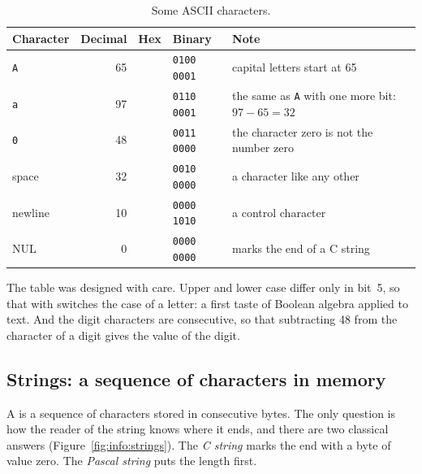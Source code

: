 \begin{table}[htb]
\centering\small
\caption{Some ASCII characters.}\label{tab:info:ascii}
\begin{tabularx}{\textwidth}{@{}lrllL@{}}
\toprule
\textbf{Character} & \textbf{Decimal} & \textbf{Hex} & \textbf{Binary} & \textbf{Note}\\
\midrule
\texttt{A} & 65 &  & \texttt{0100 0001} & capital letters start at 65\\
\texttt{a} & 97 &  & \texttt{0110 0001} & the same as \texttt{A} with one more bit: $97-65=32$\\
\texttt{0} & 48 &  & \texttt{0011 0000} & the character zero is not the number zero\\
space & 32 &  & \texttt{0010 0000} & a character like any other\\
newline & 10 &  & \texttt{0000 1010} & a control character\\
NUL & 0 &  & \texttt{0000 0000} & marks the end of a C string\\
\bottomrule
\end{tabularx}
\end{table}

The table was designed with care. Upper and lower case differ only in bit~5,
so that  with  switches the case of a letter: a first taste
of Boolean algebra applied to text. And the digit characters are consecutive,
so that subtracting 48 from the character of a digit gives the value of the
digit.

\subsection{Strings: a sequence of characters in memory}

A  is a sequence of characters stored in consecutive bytes. The
only question is how the reader of the string knows where it ends, and there
are two classical answers (Figure~\ref{fig:info:strings}). The \emph{C
string} marks the end with a byte of value zero. The \emph{Pascal string}
puts the length first.

